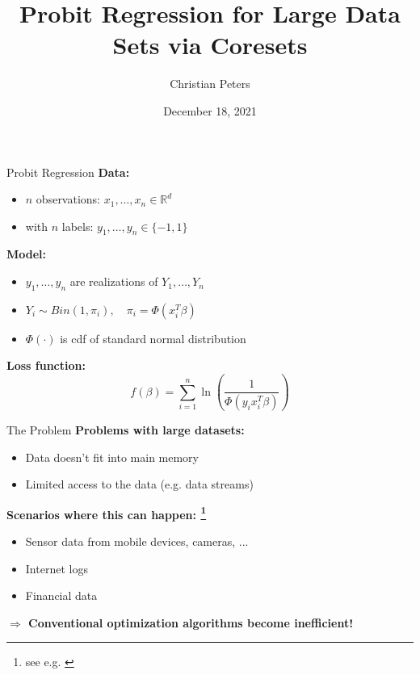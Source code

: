 \documentclass[gray]{beamer}
\title{Probit Regression for Large Data Sets via Coresets}
\author{Christian Peters}
\institute{TU Dortmund University, Germany}
\date{December 18, 2021}
\begin{document}
\begin{frame}[noframenumbering]
    \thispagestyle{empty}
    \maketitle
\end{frame}

\begin{frame}{Probit Regression}
    \textbf{Data:}
    \begin{itemize}
        \item $n$ observations: $x_1, \ldots, x_n \in \mathbb{R}^d$ \\
        \item with $n$ labels: $y_1, \ldots, y_n \in \{-1, 1\}$
    \end{itemize}

    \vspace{\fill}

    \textbf{Model:}
    \begin{itemize}
        \item $y_1, \ldots, y_n$ are realizations of $Y_1, \ldots, Y_n$
        \item $Y_i \sim Bin(1, \pi_i), \quad \pi_i = \Phi(x_i^T \beta)$
        \item $\Phi(\cdot)$ is cdf of standard normal distribution
    \end{itemize}

    \vspace{\fill}

    \textbf{Loss function:}
    \begin{equation*}
        f(\beta) = \sum_{i=1}^n \ln\left( \frac{1}{\Phi(y_ix_i^T\beta)} \right)
    \end{equation*}
\end{frame}

\begin{frame}{The Problem}
    \textbf{Problems with large datasets:}
    \begin{itemize}
        \item Data doesn't fit into main memory
        \item Limited access to the data (e.g. data streams)
    \end{itemize}

    \vspace{\fill}

    \textbf{Scenarios where this can happen:%
        \footnote{see e.g. \cite{big-data-tiny-data}}}
    \begin{itemize}
        \item Sensor data from mobile devices, cameras, ...
        \item Internet logs
        \item Financial data
    \end{itemize}

    \vspace{\fill}

    \textbf{$\Rightarrow$ Conventional optimization algorithms become inefficient!}
\end{frame}
\end{document}
